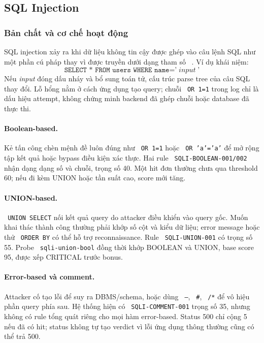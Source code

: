 \documentclass[runningheads]{report-template/llncs}
\newcommand{\code}[1]{\texttt{\small\hyphenchar\font=45 #1}}
\begin{document}
\subsection{SQL Injection}

\subsubsection{Bản chất và cơ chế hoạt động}

SQL injection xảy ra khi dữ liệu không tin cậy được ghép vào câu lệnh SQL
như một phần cú pháp thay vì được truyền dưới dạng tham số
~\cite{owaspsqli}. Ví dụ khái niệm:
\[
\texttt{SELECT * FROM users WHERE name='}\;input\;\texttt{'}
\]
Nếu \emph{input} đóng dấu nháy và bổ sung toán tử, cấu trúc parse tree
của câu SQL thay đổi. Lỗ hổng nằm ở cách ứng dụng tạo query; chuỗi
\code{OR 1=1} trong log chỉ là dấu hiệu attempt, không chứng minh backend
đã ghép chuỗi hoặc database đã thực thi.

\paragraph{Boolean-based.}
Kẻ tấn công chèn mệnh đề luôn đúng như \code{OR 1=1} hoặc
\code{OR 'a'='a'} để mở rộng tập kết quả hoặc bypass điều kiện xác thực.
Hai rule \code{SQLI-BOOLEAN-001/002} nhận dạng dạng số và chuỗi, trọng số
40. Một hit đơn thường chưa qua threshold 60; nếu đi kèm UNION hoặc tần
suất cao, score mới tăng.

\paragraph{UNION-based.}
\code{UNION SELECT} nối kết quả query do attacker điều khiển vào query
gốc. Muốn khai thác thành công thường phải khớp số cột và kiểu dữ liệu;
error message hoặc thử \code{ORDER BY} có thể hỗ trợ reconnaissance.
Rule \code{SQLI-UNION-001} có trọng số 55. Probe
\code{sqli-union-bool} đồng thời khớp BOOLEAN và UNION, base score 95,
được xếp CRITICAL trước bonus.

\paragraph{Error-based và comment.}
Attacker cố tạo lỗi để suy ra DBMS/schema, hoặc dùng \code{--},
\code{\#}, \code{/*} để vô hiệu phần query phía sau. Hệ thống hiện có
\code{SQLI-COMMENT-001} trọng số 35, nhưng không có rule tổng quát riêng
cho mọi hàm error-based. Status 500 chỉ cộng 5 nếu đã có hit; status
không tự tạo verdict vì lỗi ứng dụng thông thường cũng có thể trả 500.
\end{document}
